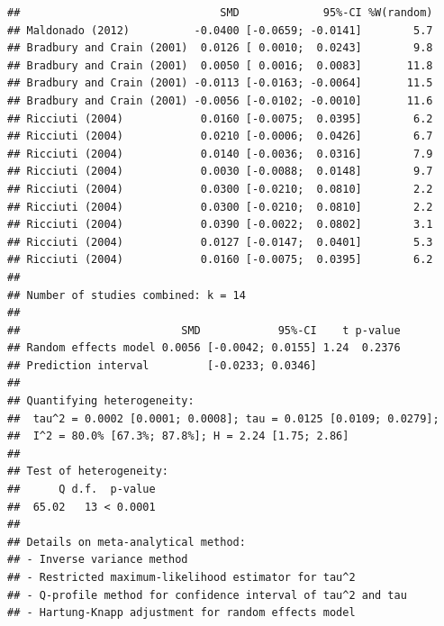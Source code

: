\documentclass[
]{article}
\newenvironment{Shaded}{\begin{snugshade}}{\end{snugshade}}
\newcommand{\CommentTok}[1]{\textcolor[rgb]{0.56,0.35,0.01}{\textit{#1}}}
\newcommand{\DataTypeTok}[1]{\textcolor[rgb]{0.13,0.29,0.53}{#1}}
\newcommand{\KeywordTok}[1]{\textcolor[rgb]{0.13,0.29,0.53}{\textbf{#1}}}
\newcommand{\NormalTok}[1]{#1}
\newcommand{\OperatorTok}[1]{\textcolor[rgb]{0.81,0.36,0.00}{\textbf{#1}}}
\newcommand{\OtherTok}[1]{\textcolor[rgb]{0.56,0.35,0.01}{#1}}
\newcommand{\StringTok}[1]{\textcolor[rgb]{0.31,0.60,0.02}{#1}}
\begin{document}
\begin{Shaded}
\end{Shaded}

\begin{verbatim}
##                               SMD             95%-CI %W(random)
## Maldonado (2012)          -0.0400 [-0.0659; -0.0141]        5.7
## Bradbury and Crain (2001)  0.0126 [ 0.0010;  0.0243]        9.8
## Bradbury and Crain (2001)  0.0050 [ 0.0016;  0.0083]       11.8
## Bradbury and Crain (2001) -0.0113 [-0.0163; -0.0064]       11.5
## Bradbury and Crain (2001) -0.0056 [-0.0102; -0.0010]       11.6
## Ricciuti (2004)            0.0160 [-0.0075;  0.0395]        6.2
## Ricciuti (2004)            0.0210 [-0.0006;  0.0426]        6.7
## Ricciuti (2004)            0.0140 [-0.0036;  0.0316]        7.9
## Ricciuti (2004)            0.0030 [-0.0088;  0.0148]        9.7
## Ricciuti (2004)            0.0300 [-0.0210;  0.0810]        2.2
## Ricciuti (2004)            0.0300 [-0.0210;  0.0810]        2.2
## Ricciuti (2004)            0.0390 [-0.0022;  0.0802]        3.1
## Ricciuti (2004)            0.0127 [-0.0147;  0.0401]        5.3
## Ricciuti (2004)            0.0160 [-0.0075;  0.0395]        6.2
## 
## Number of studies combined: k = 14
## 
##                         SMD            95%-CI    t p-value
## Random effects model 0.0056 [-0.0042; 0.0155] 1.24  0.2376
## Prediction interval         [-0.0233; 0.0346]             
## 
## Quantifying heterogeneity:
##  tau^2 = 0.0002 [0.0001; 0.0008]; tau = 0.0125 [0.0109; 0.0279];
##  I^2 = 80.0% [67.3%; 87.8%]; H = 2.24 [1.75; 2.86]
## 
## Test of heterogeneity:
##      Q d.f.  p-value
##  65.02   13 < 0.0001
## 
## Details on meta-analytical method:
## - Inverse variance method
## - Restricted maximum-likelihood estimator for tau^2
## - Q-profile method for confidence interval of tau^2 and tau
## - Hartung-Knapp adjustment for random effects model
\end{verbatim}
\end{document}
